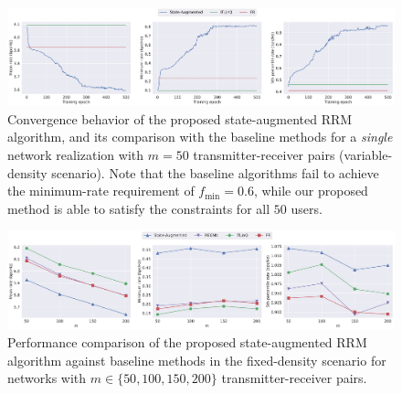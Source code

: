 \documentclass[lettersize,journal]{IEEEtran}
\begin{document}
\begin{figure}[h]
\centering
\includegraphics[width=\textwidth]{fig_convergence_singleConfig_m50_vardensity.pdf}
\caption{Convergence behavior of the proposed state-augmented RRM algorithm, and its comparison with the baseline methods for a \emph{single} network realization with $m=50$ transmitter-receiver pairs (variable-density scenario). Note that the baseline algorithms fail to achieve the minimum-rate requirement of $f_{\min}=0.6$, while our proposed method is able to satisfy the constraints for all $50$ users.
}
\label{fig:convergence_singleConfig_m50_vardensity}
\end{figure}


\begin{figure}[h]
\centering
\includegraphics[width=\textwidth]{fig_scalability_fixed_density.pdf}
\caption{Performance comparison of the proposed state-augmented RRM algorithm against baseline methods in the fixed-density scenario for networks with $m\in\{50,100,150,200\}$ transmitter-receiver pairs.}
\label{fig:scalability_fixed_density}
\end{figure}
\end{document}
